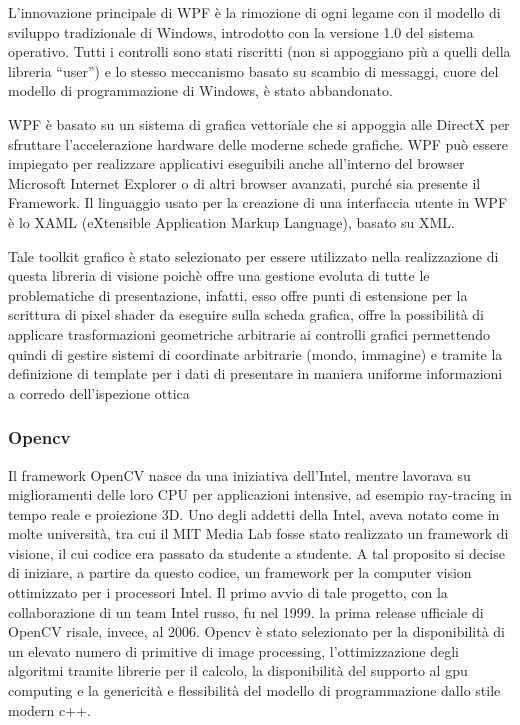 L'innovazione principale di WPF è la rimozione di ogni legame con il modello di sviluppo tradizionale di Windows, introdotto con la versione 1.0 del sistema operativo. Tutti i controlli sono stati riscritti (non si appoggiano più a quelli della libreria “user”) e lo stesso meccanismo basato su scambio di messaggi, cuore del modello di programmazione di Windows, è stato abbandonato.

WPF è basato su un sistema di grafica vettoriale che si appoggia alle DirectX per sfruttare l'accelerazione hardware delle moderne schede grafiche. WPF può essere impiegato per realizzare applicativi eseguibili anche all'interno del browser Microsoft Internet Explorer o di altri browser avanzati, purché sia presente il Framework. Il linguaggio usato per la creazione di una interfaccia utente in WPF è lo XAML (eXtensible Application Markup Language), basato su XML.

Tale toolkit grafico è stato selezionato per essere utilizzato nella realizzazione di questa libreria di visione poichè offre una gestione evoluta di tutte le problematiche di presentazione, infatti, esso offre punti di estensione per la scrittura di pixel shader da eseguire sulla scheda grafica, offre la possibilità di applicare trasformazioni geometriche arbitrarie ai controlli grafici permettendo quindi di gestire sistemi di coordinate arbitrarie (mondo, immagine) e tramite la definizione di template per i dati di presentare in maniera uniforme informazioni a corredo dell'ispezione ottica

\subsubsection{Opencv}
Il framework OpenCV nasce da una iniziativa dell’Intel, mentre lavorava
su miglioramenti delle loro CPU per applicazioni intensive, ad esempio
ray-tracing in tempo reale e proiezione 3D. Uno degli addetti della Intel,
aveva notato come in molte università, tra cui il MIT Media Lab fosse stato realizzato un framework di visione, il cui codice era passato
da studente a studente. A tal proposito si decise di iniziare, a partire da
questo codice, un framework per la computer vision ottimizzato per i processori Intel. Il
primo avvio di tale progetto, con la collaborazione di un team Intel russo,
fu nel 1999. la prima release ufficiale di OpenCV risale, invece, al 2006.
Opencv è stato selezionato per la disponibilità di un elevato numero di primitive di image processing, l'ottimizzazione degli algoritmi tramite librerie per il calcolo, la disponibilità del supporto al gpu computing e la genericità e flessibilità del modello di programmazione dallo stile modern c++.

